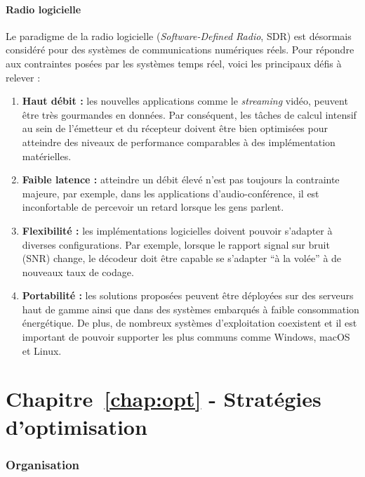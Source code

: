 \paragraph{Radio logicielle}

Le paradigme de la radio logicielle (\emph{Software-Defined Radio}, SDR) est
désormais considéré pour des systèmes de communications numériques réels. Pour
répondre aux contraintes posées par les systèmes temps réel, voici les
principaux défis à relever :

\begin{enumerate}
  \item \textbf{Haut débit :}
    les nouvelles applications comme le \emph{streaming} vidéo, peuvent être
    très gourmandes en données. Par conséquent, les tâches de calcul intensif au
    sein de l'émetteur et du récepteur doivent être bien optimisées pour
    atteindre des niveaux de performance comparables à des implémentation
    matérielles.

  \item \textbf{Faible latence :}
    atteindre un débit élevé n'est pas toujours la contrainte majeure, par
    exemple, dans les applications d'audio-conférence, il est inconfortable de
    percevoir un retard lorsque les gens parlent.

  \item \textbf{Flexibilité :}
    les implémentations logicielles doivent pouvoir s'adapter à diverses
    configurations. Par exemple, lorsque le rapport signal sur bruit (SNR)
    change, le décodeur doit être capable se s'adapter ``à la volée'' à de
    nouveaux taux de codage.

  \item \textbf{Portabilité :}
    les solutions proposées peuvent être déployées sur des serveurs haut de
    gamme ainsi que dans des systèmes embarqués à faible consommation
    énergétique. De plus, de nombreux systèmes d'exploitation coexistent et il
    est important de pouvoir supporter les plus communs comme Windows, macOS et
    Linux.
\end{enumerate}

\section*{Chapitre~\ref{chap:opt} - Stratégies d'optimisation}

\subsubsection*{Organisation}

